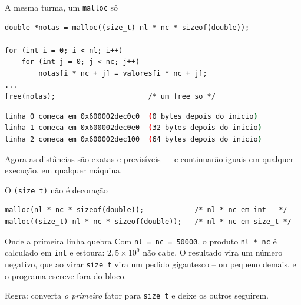 \documentclass[aspectratio=169]{beamer}
\begin{document}
\begin{frame}[fragile]{A mesma turma, um \texttt{malloc} só}
\begin{lstlisting}[basicstyle=\ttfamily\scriptsize, numbers=none]
double *notas = malloc((size_t) nl * nc * sizeof(double));

for (int i = 0; i < nl; i++)
    for (int j = 0; j < nc; j++)
        notas[i * nc + j] = valores[i * nc + j];
...
free(notas);                      /* um free so */
\end{lstlisting}
\begin{lstlisting}[basicstyle=\ttfamily\scriptsize, numbers=none, language=bash]
linha 0 comeca em 0x600002dec0c0  (0 bytes depois do inicio)
linha 1 comeca em 0x600002dec0e0  (32 bytes depois do inicio)
linha 2 comeca em 0x600002dec100  (64 bytes depois do inicio)
\end{lstlisting}
  \begin{block}{}
    \small Agora as distâncias são exatas e previsíveis --- e continuarão
    iguais em qualquer execução, em qualquer máquina.
  \end{block}
\end{frame}

\begin{frame}[fragile]{O \texttt{(size\_t)} não é decoração}
\begin{lstlisting}[basicstyle=\ttfamily\scriptsize, numbers=none]
malloc(nl * nc * sizeof(double));            /* nl * nc em int   */
malloc((size_t) nl * nc * sizeof(double));   /* nl * nc em size_t */
\end{lstlisting}
  \begin{block}{Onde a primeira linha quebra}
    Com \texttt{nl = nc = 50000}, o produto \texttt{nl * nc} é calculado em
    \texttt{int} e estoura: $2{,}5 \times 10^9$ não cabe. O resultado vira um
    número negativo, que ao virar \texttt{size\_t} vira um pedido gigantesco --
    ou pequeno demais, e o programa escreve fora do bloco.
  \end{block}
  \begin{exampleblock}{}
    \small Regra: converta \emph{o primeiro} fator para \texttt{size\_t} e
    deixe os outros seguirem.
  \end{exampleblock}
\end{frame}
\end{document}
